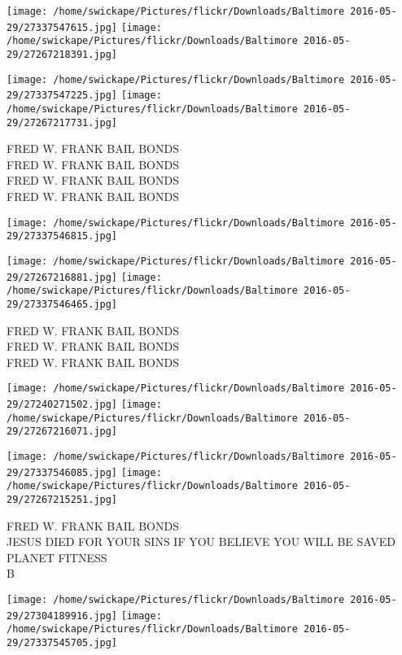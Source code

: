 \documentclass[10pt,letterpaper]{article}
\begin{document}
\texttt{[image: /home/swickape/Pictures/flickr/Downloads/Baltimore 2016-05-29/27337547615.jpg]}
\texttt{[image: /home/swickape/Pictures/flickr/Downloads/Baltimore 2016-05-29/27267218391.jpg]}

\texttt{[image: /home/swickape/Pictures/flickr/Downloads/Baltimore 2016-05-29/27337547225.jpg]}
\texttt{[image: /home/swickape/Pictures/flickr/Downloads/Baltimore 2016-05-29/27267217731.jpg]}

FRED W. FRANK BAIL BONDS\\
FRED W. FRANK BAIL BONDS\\
FRED W. FRANK BAIL BONDS\\
FRED W. FRANK BAIL BONDS\\
\pagebreak

\texttt{[image: /home/swickape/Pictures/flickr/Downloads/Baltimore 2016-05-29/27337546815.jpg]}

\vspace{0.25in}
\texttt{[image: /home/swickape/Pictures/flickr/Downloads/Baltimore 2016-05-29/27267216881.jpg]}
\texttt{[image: /home/swickape/Pictures/flickr/Downloads/Baltimore 2016-05-29/27337546465.jpg]}

FRED W. FRANK BAIL BONDS\\
FRED W. FRANK BAIL BONDS\\
FRED W. FRANK BAIL BONDS\\
\pagebreak

\texttt{[image: /home/swickape/Pictures/flickr/Downloads/Baltimore 2016-05-29/27240271502.jpg]}
\texttt{[image: /home/swickape/Pictures/flickr/Downloads/Baltimore 2016-05-29/27267216071.jpg]}

\texttt{[image: /home/swickape/Pictures/flickr/Downloads/Baltimore 2016-05-29/27337546085.jpg]}
\texttt{[image: /home/swickape/Pictures/flickr/Downloads/Baltimore 2016-05-29/27267215251.jpg]}

FRED W. FRANK BAIL BONDS\\
JESUS DIED FOR YOUR SINS IF YOU BELIEVE YOU WILL BE SAVED\\
PLANET FITNESS\\
B\\
\pagebreak

\texttt{[image: /home/swickape/Pictures/flickr/Downloads/Baltimore 2016-05-29/27304189916.jpg]}
\texttt{[image: /home/swickape/Pictures/flickr/Downloads/Baltimore 2016-05-29/27337545705.jpg]}
\end{document}
